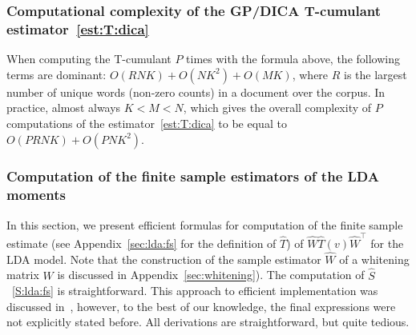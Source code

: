 \documentclass{article}
\newcommand{\wh}[1]{\widehat{#1}}
\begin{document}
\subsubsection{Computational complexity of the GP/DICA T-cumulant estimator~\eqref{est:T:dica}}\label{sec:complexity-t-cumulant}
When computing the T-cumulant $P$ times with the formula above, the following terms are dominant: $O(RNK) + O(NK^2) + O(MK)$, where $R$ is the largest number of unique words (non-zero counts) in a document over the corpus. In practice, almost always $K < M < N$, which gives the overall complexity of $P$ computations of the estimator~\eqref{est:T:dica} to be equal to $O(PRNK) + O(PNK^2)$.














\subsubsection{Computation of the finite sample estimators of the LDA moments} \label{sec:lda:empirical}
In this section, we present efficient formulas for computation of the finite sample estimate (see Appendix~\ref{sec:lda:fs} for the definition of $\wh{T}$) of $\wh{W}\wh{T}(v)\wh{W}^{\top}$ for the LDA model. Note that the construction of the sample estimator $\wh{W}$ of a whitening matrix $W$ is discussed in Appendix~\ref{sec:whitening}). The computation of $\wh{S}$~\eqref{S:lda:fs} is straightforward.
This approach to efficient implementation was discussed in~\cite{AnaEtAl2014}, however, to the best of our knowledge, the final expressions were not explicitly stated before. All derivations are straightforward, but quite tedious. 
\end{document}
